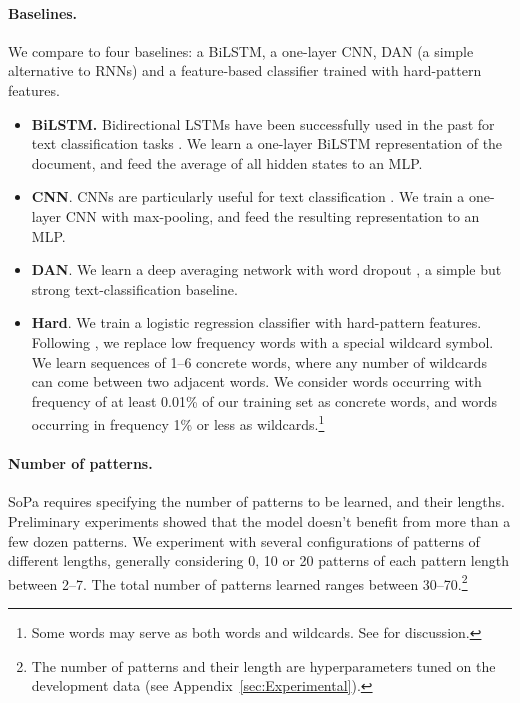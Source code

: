 \documentclass[11pt,a4paper]{article}
\renewcommand{\cite}[1]{\citep{#1}}
\newcommand{\appref}[1]{Appendix~\ref{sec:#1}}
\newcommand{\SoftP}{SoPa\xspace}
\newcommand{\camready}[1]{#1}
\begin{document}
\paragraph{Baselines.}
We compare to four baselines: 
a BiLSTM, a one-layer CNN, DAN (a simple alternative to RNNs) and a feature-based classifier trained with hard-pattern features.



\begin{itemize}[itemsep=0pt,topsep=3pt,leftmargin=*]
\item{\bf BiLSTM.} 
Bidirectional LSTMs have been successfully used in the past for text classification tasks \cite{Zhou:2016}.
We learn a one-layer BiLSTM representation of the
document, and feed the average of all hidden states to an MLP. 

\item{\bf CNN}.
CNNs are particularly useful for text classification \cite{kim_convolutional_2014}.
We train a one-layer CNN with max-pooling, and feed the resulting representation to an MLP.


\item{\bf DAN}. 
We learn a deep averaging network with word dropout \cite{Iyyer:2015}, a simple but strong text-classification baseline.

\item{\bf Hard}. 
We train a logistic regression classifier with hard-pattern features. 
Following \citet{Tsur:2010}, we replace low frequency words with a special wildcard symbol.
We learn sequences of 1--6 concrete words,
where any number of wildcards can come between two adjacent 
words. \camready{We consider words occurring with frequency of at least 0.01\% of our training set as concrete words, and words occurring in frequency 1\% or less as wildcards.\footnote{Some words may serve as both words and wildcards. See \citet{Davidov:2008} for discussion.}}

\end{itemize}


\paragraph{Number of patterns.}

\SoftP requires specifying the number of patterns to be learned, and their lengths.
Preliminary experiments showed that the model doesn't benefit from more than a few dozen patterns.
We experiment with several configurations of patterns of different lengths, generally considering 0, 10 or 20 patterns of each pattern length between 2--7.
The total number of patterns learned ranges between 30--70.\footnote{The number of patterns and their length are hyperparameters tuned on the development data (see \appref{Experimental}).}
\end{document}
